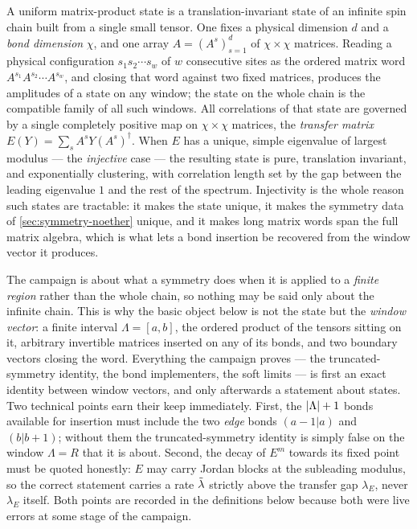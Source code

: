 A uniform matrix-product state is a translation-invariant state of an infinite
spin chain built from a single small tensor. One fixes a physical dimension
$d$ and a \emph{bond dimension} $\chi$, and one array $A = (A^{s})_{s=1}^{d}$
of $\chi \times \chi$ matrices. Reading a physical configuration
$s_{1}s_{2}\cdots s_{w}$ of $w$ consecutive sites as the ordered matrix word
$A^{s_{1}}A^{s_{2}}\cdots A^{s_{w}}$, and closing that word against two fixed
matrices, produces the amplitudes of a state on any window; the state on the
whole chain is the compatible family of all such windows. All correlations of
that state are governed by a single completely positive map on
$\chi \times \chi$ matrices, the \emph{transfer matrix}
$E(Y) = \sum_{s} A^{s} Y (A^{s})^{\dagger}$. When $E$ has a unique, simple
eigenvalue of largest modulus --- the \emph{injective} case --- the resulting
state is pure, translation invariant, and exponentially clustering, with
correlation length set by the gap between the leading eigenvalue $1$ and the
rest of the spectrum. Injectivity is the whole reason such states are
tractable: it makes the state unique, it makes the symmetry data of
\cref{sec:symmetry-noether} unique, and it makes long matrix words span the
full matrix algebra, which is what lets a bond insertion be recovered from the
window vector it produces.

The campaign is about what a symmetry does when it is applied to a
\emph{finite region} rather than the whole chain, so nothing may be said only
about the infinite chain. This is why the basic object below is not the state
but the \emph{window vector}: a finite interval $\Lambda = [a,b]$, the ordered
product of the tensors sitting on it, arbitrary invertible matrices inserted on
any of its bonds, and two boundary vectors closing the word. Everything the
campaign proves --- the truncated-symmetry identity, the bond implementers, the
soft limits --- is first an exact identity between window vectors, and only
afterwards a statement about states. Two technical points earn their keep
immediately. First, the $\lvert \Lambda\rvert+1$ bonds available for insertion must
include the two \emph{edge} bonds $(a-1|a)$ and $(b|b+1)$; without them the
truncated-symmetry identity is simply false on the window $\Lambda = R$ that it
is about. Second, the decay of $E^{m}$ towards its fixed point must be quoted
honestly: $E$ may carry Jordan blocks at the subleading modulus, so the correct
statement carries a rate $\tilde{\lambda}$ strictly above the transfer gap $\lambda_{E}$,
never $\lambda_{E}$ itself. Both points are recorded in the definitions below
because both were live errors at some stage of the campaign.

